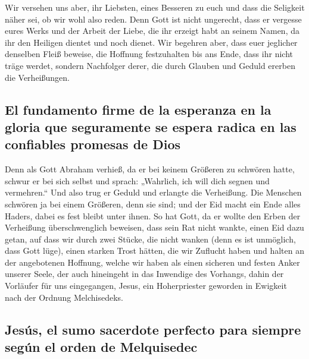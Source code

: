  Wir versehen uns aber, ihr Liebsten, eines Besseren zu
euch und dass die Seligkeit näher sei, ob wir wohl also reden.
 Denn Gott ist nicht ungerecht, dass er vergesse eures
Werks und der Arbeit der Liebe, die ihr erzeigt habt an seinem Namen, da
ihr den Heiligen dientet und noch dienet.  Wir begehren
aber, dass euer jeglicher denselben Fleiß beweise, die Hoffnung
festzuhalten bis ans Ende,  dass ihr nicht träge werdet,
sondern Nachfolger derer, die durch Glauben und Geduld ererben die
Verheißungen.

\hypertarget{el-fundamento-firme-de-la-esperanza-en-la-gloria-que-seguramente-se-espera-radica-en-las-confiables-promesas-de-dios}{%
\subsection{El fundamento firme de la esperanza en la gloria que
seguramente se espera radica en las confiables promesas de
Dios}\label{el-fundamento-firme-de-la-esperanza-en-la-gloria-que-seguramente-se-espera-radica-en-las-confiables-promesas-de-dios}}

 Denn als Gott Abraham verhieß, da er bei keinem Größeren
zu schwören hatte, schwur er bei sich selbst  und sprach:
„Wahrlich, ich will dich segnen und vermehren.``  Und
also trug er Geduld und erlangte die Verheißung.  Die
Menschen schwören ja bei einem Größeren, denn sie sind; und der Eid
macht ein Ende alles Haders, dabei es fest bleibt unter ihnen.
 So hat Gott, da er wollte den Erben der Verheißung
überschwenglich beweisen, dass sein Rat nicht wankte, einen Eid dazu
getan,  auf dass wir durch zwei Stücke, die nicht wanken
(denn es ist unmöglich, dass Gott lüge), einen starken Trost hätten, die
wir Zuflucht haben und halten an der angebotenen Hoffnung,
 welche wir haben als einen sicheren und festen Anker
unserer Seele, der auch hineingeht in das Inwendige des Vorhangs,
 dahin der Vorläufer für uns eingegangen, Jesus, ein
Hoherpriester geworden in Ewigkeit nach der Ordnung Melchisedeks.

\hypertarget{jesuxfas-el-sumo-sacerdote-perfecto-para-siempre-seguxfan-el-orden-de-melquisedec}{%
\subsection{Jesús, el sumo sacerdote perfecto para siempre según el
orden de
Melquisedec}\label{jesuxfas-el-sumo-sacerdote-perfecto-para-siempre-seguxfan-el-orden-de-melquisedec}}

